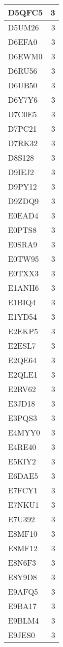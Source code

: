 \documentclass[
]{book}
\theoremstyle{definition}
\theoremstyle{definition}
\theoremstyle{definition}
\theoremstyle{definition}
\theoremstyle{remark}
\begin{document}
\begin{table}
\begin{tabular}{l|r}
\hline
D5QFC5 & 3\\
\hline
D5UM26 & 3\\
\hline
D6EFA0 & 3\\
\hline
D6EWM0 & 3\\
\hline
D6RU56 & 3\\
\hline
D6UB50 & 3\\
\hline
D6Y7Y6 & 3\\
\hline
D7C0E5 & 3\\
\hline
D7PC21 & 3\\
\hline
D7RK32 & 3\\
\hline
D8S128 & 3\\
\hline
D9IEJ2 & 3\\
\hline
D9PY12 & 3\\
\hline
D9ZDQ9 & 3\\
\hline
E0EAD4 & 3\\
\hline
E0PTS8 & 3\\
\hline
E0SRA9 & 3\\
\hline
E0TW95 & 3\\
\hline
E0TXX3 & 3\\
\hline
E1ANH6 & 3\\
\hline
E1BIQ4 & 3\\
\hline
E1YD54 & 3\\
\hline
E2EKP5 & 3\\
\hline
E2ESL7 & 3\\
\hline
E2QE64 & 3\\
\hline
E2QLE1 & 3\\
\hline
E2RV62 & 3\\
\hline
E3JD18 & 3\\
\hline
E3PQS3 & 3\\
\hline
E4MYY0 & 3\\
\hline
E4RE40 & 3\\
\hline
E5KIY2 & 3\\
\hline
E6DAE5 & 3\\
\hline
E7FCY1 & 3\\
\hline
E7NKU1 & 3\\
\hline
E7U392 & 3\\
\hline
E8MF10 & 3\\
\hline
E8MF12 & 3\\
\hline
E8N6F3 & 3\\
\hline
E8Y9D8 & 3\\
\hline
E9AFQ5 & 3\\
\hline
E9BA17 & 3\\
\hline
E9BLM4 & 3\\
\hline
E9JES0 & 3\\

\end{tabular}
\end{table}
\end{document}
